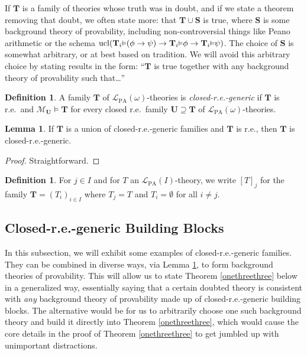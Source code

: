 \documentclass[reqno]{article}
\theoremstyle{definition}
\newtheorem{lemma}[theorem]{Lemma}
\newtheorem{definition}[theorem]{Definition}
\def\L{\mathscr{L}}
\def\M{\mathscr{M}}
\def\T{\mathbf{T}}
\def\S{\mathbf{S}}
\def\U{\mathbf{U}}
\def\LPA{\L_{\mathrm{PA}}}
\renewcommand{\Pr}[1]{\T_{#1}\mbox{\small${\vDash}$}}
\newcommand{\ucl}[1]{\mathrm{ucl}(#1)}
\begin{document}
If $\T$ is a family of
theories whose truth was in doubt,
and if we state a theorem removing that doubt,
we often state more:
that $\T\cup\S$
is true,
where $\S$ is some
background theory of provability, including non-controversial things
like Peano arithmetic or the schema $\ucl{\Pr i(\phi\rightarrow\psi)\rightarrow\Pr i\phi\rightarrow\Pr i\psi}$.
The choice of $\S$ is somewhat arbitrary, or at best based on tradition.
We will avoid this arbitrary choice by stating results in the form:
``$\T$ is true together with any background theory of provability such that\ldots''


\begin{definition}
\label{closedregenericdefn}
A family $\T$ of $\LPA(\omega)$-theories is
\emph{closed-r.e.-generic}
if $\T$ is r.e.~and
$\M_{\U}\models\T$ for every closed r.e.~family $\U\supseteq\T$ of $\LPA(\omega)$-theories.
\end{definition}

\begin{lemma}
\label{genericclosedreunion}
If $\T$ is a union of closed-r.e.-generic families
and $\T$ is r.e., then $\T$ is closed-r.e.-generic.
\end{lemma}

\begin{proof}
Straightforward.
\end{proof}

\begin{definition}
For $j\in I$ and for $T$ an $\LPA(I)$-theory,
we write $[T]_j$ for the family $\T=(T_i)_{i\in I}$
where $T_j=T$ and $T_i=\emptyset$ for all $i\not=j$.
\end{definition}

\subsection{Closed-r.e.-generic Building Blocks}
\label{closedregenericblocks}

In this subsection, we will exhibit some examples of closed-r.e.-generic families.
They can be combined in diverse ways, via Lemma \ref{genericclosedreunion}, to
form background theories of provability. This will allow us to state
Theorem \ref{onethreethree} below in a generalized way, essentially saying
that a certain doubted theory is consistent with \emph{any} background theory
of provability made up of closed-r.e.-generic building blocks.
The alternative would be for us to arbitrarily choose one such background
theory and build it directly into Theorem \ref{onethreethree}, which would
cause the core details in the proof of Theorem \ref{onethreethree} to get
jumbled up with unimportant distractions.
\end{document}
